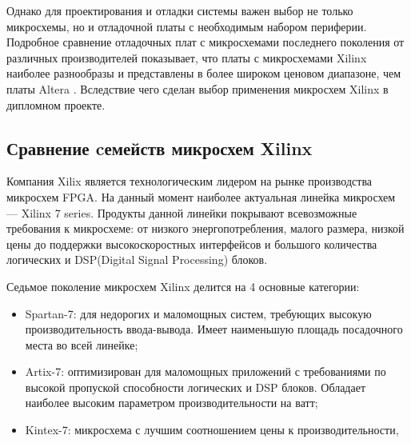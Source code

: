 Однако для проектирования и отладки системы важен выбор не только микросхемы,
но и отладочной платы с необходимым набором периферии. Подробное сравнение отладочных
плат с микросхемами последнего поколения от различных производителей показывает, что
платы с микросхемами Xilinx наиболее разнообразы и представлены в более широком ценовом диапазоне,
чем платы Altera \cite{fpga_boards_comparison}.
Вследствие чего сделан выбор применения микросхем Xilinx в дипломном проекте.

\subsection{Сравнение cемейств микросхем Xilinx}
\label{sub:domain:fpga_comparison}

Компания Xilix является технологическим лидером на рынке производства микросхем FPGA.
На данный момент наиболее актуальная линейка микросхем --- Xilinx 7 series.
Продукты данной линейки покрывают всевозможные требования к микросхеме: от низкого энергопотребления, малого размера, низкой цены до
поддержки высокоскоростных интерфейсов и большого количества логических и DSP(Digital Signal Processing) блоков.

Седьмое поколение микросхем Xilinx делится на 4 основные категории:
\begin{itemize}
  \item Spartan-7: для недорогих и маломощных систем, требующих высокую производительность ввода-вывода.
    Имеет наименьшую площадь посадочного места во всей линейке;
  \item Artix-7: оптимизирован для маломощных приложений с требованиями по высокой пропуской способности логических и DSP блоков.
    Обладает наиболее высоким параметром производительности на ватт;
  \item Kintex-7: микросхема с лучшим соотношением цены к производительности,
\end{itemize}




